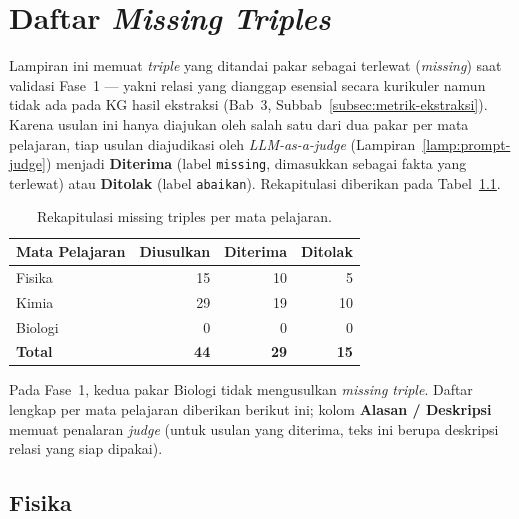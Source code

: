 \documentclass[main]{subfiles}
\begin{document}
\ifSubfilesClassLoaded{}{\appendix\setcounter{chapter}{6}}

\chapter{Daftar \textit{Missing Triples}}
\label{lamp:missing-triples}

Lampiran ini memuat \textit{triple} yang ditandai pakar sebagai terlewat
(\textit{missing}) saat validasi Fase~1 --- yakni relasi yang dianggap esensial
secara kurikuler namun tidak ada pada KG hasil ekstraksi (Bab~3,
Subbab~\ref{subsec:metrik-ekstraksi}). Karena usulan ini hanya diajukan oleh
salah satu dari dua pakar per mata pelajaran, tiap usulan diajudikasi oleh
\textit{LLM-as-a-judge} (Lampiran~\ref{lamp:prompt-judge}) menjadi
\textbf{Diterima} (label \texttt{missing}, dimasukkan sebagai fakta yang
terlewat) atau \textbf{Ditolak} (label \texttt{abaikan}). Rekapitulasi diberikan
pada Tabel~\ref{tab:mt-rekap}.

\begin{table}[h]
  \centering
  \caption{Rekapitulasi missing triples per mata pelajaran.}
  \label{tab:mt-rekap}
  \footnotesize
  \begin{tabularx}{\linewidth}{@{}X r r r@{}}
    \toprule
    \textbf{Mata Pelajaran} & \textbf{Diusulkan} & \textbf{Diterima} & \textbf{Ditolak} \\
    \midrule
    Fisika & 15 & 10 & 5 \\
    Kimia & 29 & 19 & 10 \\
    Biologi & 0 & 0 & 0 \\
    \midrule
    \textbf{Total} & \textbf{44} & \textbf{29} & \textbf{15} \\
    \bottomrule
  \end{tabularx}
\end{table}

\noindent Pada Fase~1, kedua pakar Biologi tidak mengusulkan \textit{missing
triple}. Daftar lengkap per mata pelajaran diberikan berikut ini; kolom
\textbf{Alasan / Deskripsi} memuat penalaran \textit{judge} (untuk usulan yang
diterima, teks ini berupa deskripsi relasi yang siap dipakai).

\section{Fisika}
\label{lamp:mt-fisika}
\end{document}

